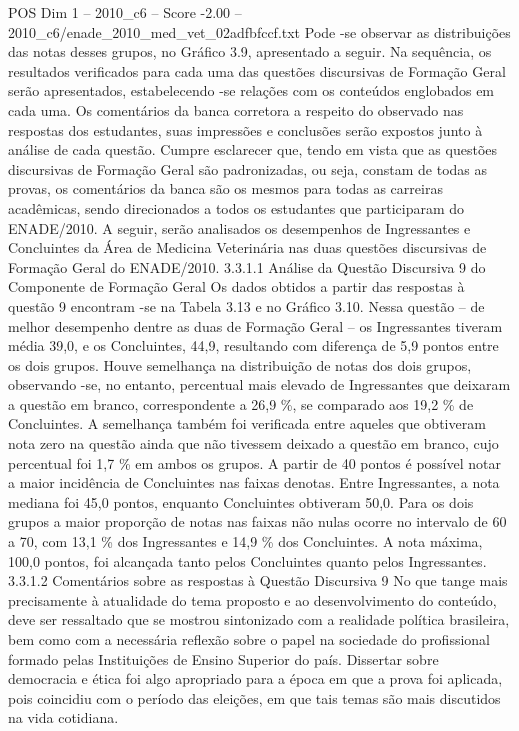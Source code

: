 \begin{textsample}{POS Dim 1 – 2010\_c6 – Score -2.00 – 2010\_c6/enade\_2010\_med\_vet\_02adfbfccf.txt}
Pode -se observar as distribuições das notas desses grupos, no Gráfico 3.9, apresentado a seguir.
Na sequência, os resultados verificados para cada uma das questões discursivas de Formação Geral serão apresentados, estabelecendo -se relações com os conteúdos englobados em cada uma.
Os comentários da banca corretora a respeito do observado nas respostas dos estudantes, suas impressões e conclusões serão expostos junto à análise de cada questão.
Cumpre esclarecer que, tendo em vista que as questões discursivas de Formação Geral são padronizadas, ou seja, constam de todas as provas, os comentários da banca são os mesmos para todas as carreiras acadêmicas, sendo direcionados a todos os estudantes que participaram do ENADE/2010.
A seguir, serão analisados os desempenhos de Ingressantes e Concluintes da Área de Medicina Veterinária nas duas questões discursivas de Formação Geral do ENADE/2010. 3.3.1.1 Análise da Questão Discursiva 9 do Componente de Formação Geral Os dados obtidos a partir das respostas à questão 9 encontram -se na Tabela 3.13 e no Gráfico 3.10.
Nessa questão – de melhor desempenho dentre as duas de Formação Geral – os Ingressantes tiveram média 39,0, e os Concluintes, 44,9, resultando com diferença de 5,9 pontos entre os dois grupos.
Houve semelhança na distribuição de notas dos dois grupos, observando -se, no entanto, percentual mais elevado de Ingressantes que deixaram a questão em branco, correspondente a 26,9 \%, se comparado aos 19,2 \% de Concluintes.
A semelhança também foi verificada entre aqueles que obtiveram nota zero na questão ainda que não tivessem deixado a questão em branco, cujo percentual foi 1,7 \% em ambos os grupos.
A partir de 40 pontos é possível notar a maior incidência de Concluintes nas faixas denotas.
Entre Ingressantes, a nota mediana foi 45,0 pontos, enquanto Concluintes obtiveram 50,0.
Para os dois grupos a maior proporção de notas nas faixas não nulas ocorre no intervalo de 60 a 70, com 13,1 \% dos Ingressantes e 14,9 \% dos Concluintes.
A nota máxima, 100,0 pontos, foi alcançada tanto pelos Concluintes quanto pelos Ingressantes. 3.3.1.2 Comentários sobre as respostas à Questão Discursiva 9 No que tange mais precisamente à atualidade do tema proposto e ao desenvolvimento do conteúdo, deve ser ressaltado que se mostrou sintonizado com a realidade política brasileira, bem como com a necessária reflexão sobre o papel na sociedade do profissional formado pelas Instituições de Ensino Superior do país.
Dissertar sobre democracia e ética foi algo apropriado para a época em que a prova foi aplicada, pois coincidiu com o período das eleições, em que tais temas são mais discutidos na vida cotidiana.

\end{textsample}
